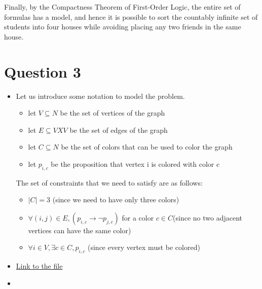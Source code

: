 \documentclass{article}
\begin{document}
Finally, by the Compactness Theorem of First-Order Logic, the entire set of formulas has a model, and hence it is possible to sort the countably infinite set of students into four houses while avoiding placing any two friends in the same house.

\section{Question 3}

\begin{itemize}
    \item Let us introduce some notation to model the problem.
    
    \begin{itemize}
        \item let $V \subseteq N$ be the set of vertices of the graph 
        \item let $E \subseteq V X V$ be the set of edges of the graph
        \item let $C \subseteq N$ be the set of colors that can be used to color the graph
        \item let $p_{i,c}$ be the proposition that vertex i is colored with color c
    \end{itemize}

    The set of constraints that we need to satisfy are as follows:

    \begin{itemize}
        \item $|C| = 3$ (since we need to have only three colors)
        \item $\forall (i,j) \in E, (p_{i,c} \rightarrow \neg{p_{j,c}})$ for a color $c \in C$(since no two adjacent vertices can have the same color)
        \item $\forall i \in V, \exists c \in C, p_{i,c}$ (since every vertex must be colored)
    \end{itemize}
    
    \item \href{https://github.com/devg24/CS474/tree/main/HW1}{Link to the file}
    \item 


\end{itemize}
\end{document}
